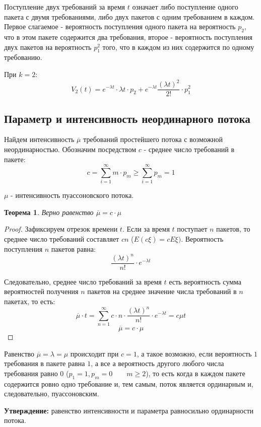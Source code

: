 \documentclass[aps,%
12pt,%
final,%
oneside,
onecolumn,%
musixtex, %
superscriptaddress,%
centertags]{article} %
\theoremstyle{plain}
\newtheorem{theorem}{Теорема}[section] %
\theoremstyle{definition}
\theoremstyle{remark}
\begin{document}
Поступление двух требований за время $t$ означает либо поступление одного пакета с двумя требованиями, либо двух пакетов с одним требованием в каждом. Первое слагаемое - вероятность поступления одного пакета на вероятность $p_2$, что в этом пакете содержится два требования,  второе - вероятность поступления двух пакетов на вероятность $p_1^2$ того, что в каждом из них содержится по одному требованию.

При $k=2$:
$$V_2(t) = e^{-\lambda t} \cdot \lambda t \cdot p_2 + e^{-\lambda t} \frac{(\lambda t)^2}{2!} \cdot p_1^2$$

\newpage
\subsection{ Параметр и интенсивность неординарного потока}

Найдем интенсивность $\overline{\mu}$ требований простейшего потока с возможной неординарностью. Обозначим посредством $c$ - среднее число требований в пакете:
$$c = \sum\limits_{i=1}^{\infty} m \cdot p_m \geq \sum\limits_{i=1}^{\infty}p_m  = 1$$

$\mu$ - интенсивность пуассоновского потока. 

\begin{theorem}
	Верно равенство $\overline{\mu} = c \cdot \mu$	
\end{theorem}
\begin{proof}
	Зафиксируем отрезок времени $t$. Если за время $t$ поступает $n$ пакетов, то среднее число требований составляет $cn$ ($E(c\xi) = c E\xi)$. Вероятность поступления $n$ пакетов равна:
	$$\frac{(\lambda t)^n}{n!} \cdot e^{-\lambda t}$$

	Следовательно, среднее число требований за время $t$ есть вероятность сумма вероятностей получения $n$ пакетов на среднее значение числа требований в $n$ пакетах, то есть:
	$$\overline{\mu} \cdot t =  \sum\limits_{n=1}^{\infty} c \cdot n \cdot \frac{(\lambda t)^n}{n!} \cdot e^{-\lambda t} = c \mu t$$
	$$\overline{\mu} = c \cdot \mu$$
\end{proof}

Равенство $\overline{\mu}= \lambda = \mu$ происходит при $c=1$, а такое возможно, если вероятность $1$ требования в пакете равна $1$, а все а вероятность другого любого числа требования равно $0$ ($p_1=1,p_m=0 \qquad m \geq 2$), то есть когда в каждом пакете содержится ровно одно требование и, тем самым, поток является ординарным и, следовательно, пуассоновским.

\textbf{Утверждение:} равенство интенсивности и параметра равносильно ординарности потока.
\end{document}
